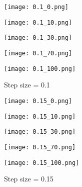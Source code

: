 \documentclass[12pt,a4paper]{article}
\theoremstyle{remark}
\begin{document}
\begin{enumerate}
    \begin{figure}
        \centering
        \begin{minipage}{0.48\textwidth}
            \centering
            \texttt{[image: 0.1\_0.png]}
            \caption*{$K = 0$}
        \end{minipage}
        \begin{minipage}{0.48\textwidth}
            \centering
            \texttt{[image: 0.1\_10.png]}
            \caption*{$K = 10$}
        \end{minipage}
        \begin{minipage}{0.48\textwidth}
            \centering
            \texttt{[image: 0.1\_30.png]}
            \caption*{$K = 30$}
        \end{minipage}
        \begin{minipage}{0.48\textwidth}
            \centering
            \texttt{[image: 0.1\_70.png]}
            \caption*{$K = 70$}
        \end{minipage}
        \begin{minipage}{0.4\textwidth}
            \centering
            \texttt{[image: 0.1\_100.png]}
            \caption*{$K = 100$}
        \end{minipage}
        \caption{Step size = 0.1}
        \label{fig:0.1}
    \end{figure}

    \begin{figure}
        \centering
        \begin{minipage}{0.48\textwidth}
            \centering
            \texttt{[image: 0.15\_0.png]}
            \caption*{$K = 0$}
        \end{minipage}
        \begin{minipage}{0.48\textwidth}
            \centering
            \texttt{[image: 0.15\_10.png]}
            \caption*{$K = 10$}
        \end{minipage}
        \begin{minipage}{0.48\textwidth}
            \centering
            \texttt{[image: 0.15\_30.png]}
            \caption*{$K = 30$}
        \end{minipage}
        \begin{minipage}{0.48\textwidth}
            \centering
            \texttt{[image: 0.15\_70.png]}
            \caption*{$K = 70$}
        \end{minipage}
        \begin{minipage}{0.4\textwidth}
            \centering
            \texttt{[image: 0.15\_100.png]}
            \caption*{$K = 100$}
        \end{minipage}
        \caption{Step size = 0.15}
        \label{fig:0.15}
    \end{figure}


\end{enumerate}
\end{document}
